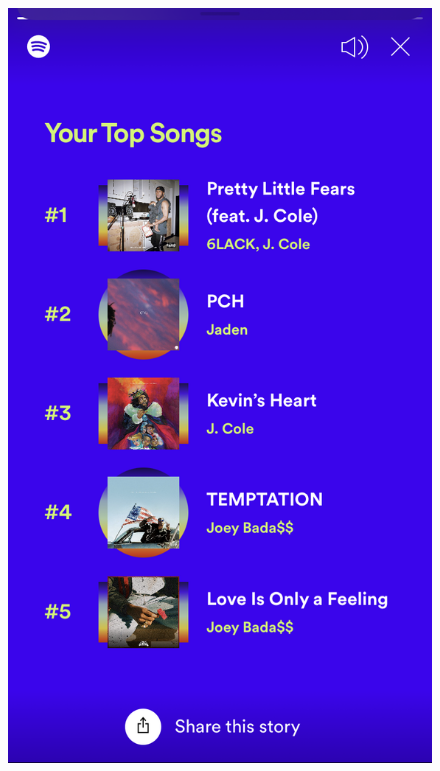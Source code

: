 \documentclass{report}
\begin{document}
\begin{figure}
\begin{minipage}[b]{0.25\textwidth}
    \includegraphics[width=\textwidth]{Imagens/IMG_3827.PNG}
  \end{minipage}
  \hfill
   \begin{minipage}[b]{0.25\textwidth}

\end{minipage}
\end{figure}
\end{document}
